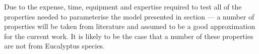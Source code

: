 Due to the expense, time, equipment and expertise required to test all of the
properties needed to parameterise the model presented in section --- a number of
properties will be taken from literature and assumed to be a good approximation
for the current work. It is likely to be the case that a number of these
properties are not from Eucalyptus species.